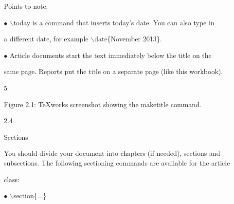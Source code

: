\documentclass[a4paper,portrait,12pt]{article}
\begin{document}
\begin{flushleft}
Points to note:
\end{flushleft}


\begin{flushleft}
$\bullet$ \ensuremath{\backslash}today is a command that inserts today's date. You can also type in
\end{flushleft}


\begin{flushleft}
a different date, for example \ensuremath{\backslash}date\{November 2013\}.
\end{flushleft}


\begin{flushleft}
$\bullet$ Article documents start the text immediately below the title on the
\end{flushleft}


\begin{flushleft}
same page. Reports put the title on a separate page (like this workbook).
\end{flushleft}


5





\begin{flushleft}
\newpage
Figure 2.1: TeXworks screenshot showing the maketitle command.
\end{flushleft}





2.4





\begin{flushleft}
Sections
\end{flushleft}





\begin{flushleft}
You should divide your document into chapters (if needed), sections and subsections. The following sectioning commands are available for the article
\end{flushleft}


\begin{flushleft}
class:
\end{flushleft}


\begin{flushleft}
$\bullet$ \ensuremath{\backslash}section\{...\}
\end{flushleft}
\end{document}
